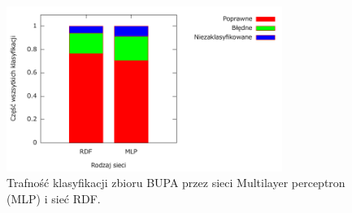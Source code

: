 \begin{enumerate}
\begin{figure}[h]
\centering
\includegraphics[width=0.8\textwidth]{dane/part1/zad11/bupa-rbf-mlp}
\caption{Trafność klasyfikacji zbioru BUPA przez sieci Multilayer perceptron (MLP) i sieć RDF.\label{fig:bupa-rbf-mlp}}
\end{figure}

\end{enumerate}

